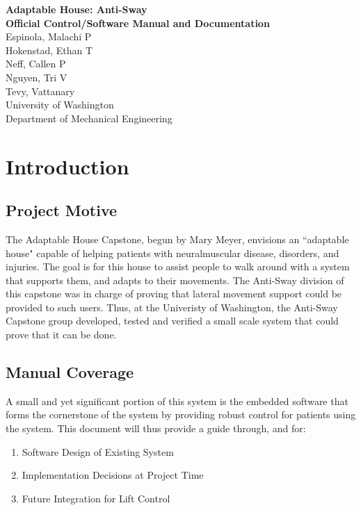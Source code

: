 \documentclass[letterpaper]{article}
\begin{document}
\begin{titlepage}
    \begin{center}
       \Large\textbf{Adaptable House: Anti-Sway} \\
       \Large\textbf{Official Control/Software Manual and Documentation} \\
       \large{Espinola, Malachi P} \\
       \large{Hokenstad, Ethan T} \\
       \large{Neff, Callen P} \\
       \large{Nguyen, Tri V} \\
       \large{Tevy, Vattanary} \\
       \Large{University of Washington} \\
       \Large{Department of Mechanical Engineering} \\
    \end{center}
\end{titlepage}

\newpage

\tableofcontents

\newpage

\section{Introduction}
\subsection{Project Motive}
The Adaptable House Capstone, begun by Mary Meyer, envisions an ``adaptable house" capable of helping patients with neuralmuscular disease, disorders, and injuries. The goal is for this house to assist people to walk around with a system that supports them, and adapts to their movements. The Anti-Sway division of this capstone was in charge of proving that lateral movement support could be provided to such users. Thus, at the Univeristy of Washington, the Anti-Sway Capstone group developed, tested and verified a small scale system that could prove that it can be done. 
\subsection{Manual Coverage}
A small and yet significant portion of this system is the embedded software that forms the cornerstone of the system by providing robust control for patients using the system. This document will thus provide a guide through, and for:
\begin{enumerate}
    \item Software Design of Existing System
    \item Implementation Decisions at Project Time
    \item Future Integration for Lift Control
\end{enumerate}
\end{document}
